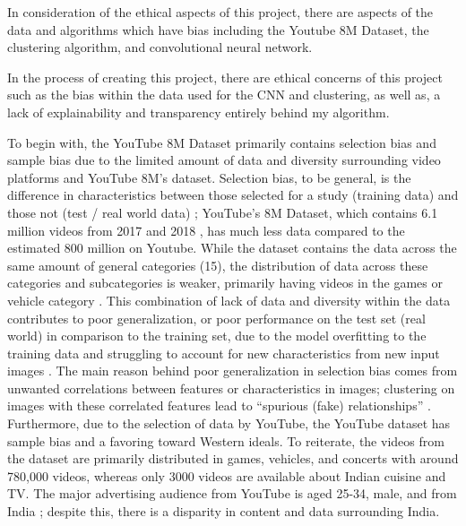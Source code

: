 \documentclass[10pt,twocolumn]{article}
\begin{document}


In consideration of the ethical aspects of this project, there are aspects of the data and algorithms which have bias including the Youtube 8M Dataset, the clustering algorithm, and convolutional neural network.

In the process of creating this project, there are ethical concerns of this project such as the bias within the data used for the CNN and clustering, as well as, a lack of explainability and transparency entirely behind my algorithm.

To begin with, the YouTube 8M Dataset primarily contains selection bias and sample bias due to the limited amount of data and diversity surrounding video platforms and YouTube 8M’s dataset. Selection bias, to be general, is the difference in characteristics between those selected for a study (training data) and those not (test / real world data) \cite{Yu2020}; YouTube’s 8M Dataset, which contains 6.1 million videos from 2017 and 2018 \cite{googleYT8M}, has much less data compared to the estimated 800 million on Youtube. While the dataset contains the data across the same amount of general categories (15), the distribution of data across these categories and subcategories is weaker, primarily having videos in the games or vehicle category \cite{googleYT8M}. This combination of lack of data and diversity within the data contributes to poor generalization, or poor performance on the test set (real world) in comparison to the training set, due to the model overfitting to the training data and struggling to account for new characteristics from new input images \cite{Yu2020}. The main reason behind poor generalization in selection bias comes from unwanted correlations between features or characteristics in images; clustering on images with these correlated features lead to “spurious (fake) relationships” \cite{Yu2020}. Furthermore, due to the selection of data by YouTube, the YouTube dataset has sample bias and a favoring toward Western ideals. To reiterate, the videos from the dataset are primarily distributed in games, vehicles, and concerts with around 780,000 videos, whereas only 3000 videos are available about Indian cuisine and TV. The major advertising audience from YouTube is aged 25-34, male, and from India \cite{HootSuite2022}; despite this, there is a disparity in content and data surrounding India.
\end{document}
